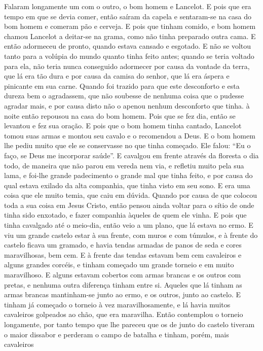 Falaram longamente um com o outro, o bom homem e Lancelot. E pois que era tempo
em que se devia comer, então saíram da capela e sentaram-se na casa do bom
homem e comeram pão e cerveja. E pois que tinham comido, e bom homem
chamou Lancelot a deitar-se na grama, como não tinha preparado outra cama. E
então adormeceu de pronto, quando estava cansado e esgotado. E não se voltou
tanto para a volúpia do mundo quanto tinha feito antes; quando se teria voltado
para ela, não teria nunca conseguido adormecer por causa da vontade da terra,
que lá era tão dura e por causa da camisa do senhor, que lá era áspera e
pinicante em sua carne. Quando foi trazido para que este desconforto e esta
dureza bem o agradassem, que não soubesse de nenhuma coisa que o pudesse
agradar mais, e por causa disto não o apenou nenhum desconforto que tinha. à
noite então repousou na casa do bom homem. Pois que se fez dia, então se
levantou e fez sua oração. E pois que o bom homem tinha cantado, Lancelot
tomou suas armas e montou seu cavalo e o recomendou a Deus. E o bom homem lhe
pediu muito que ele se conservasse no que tinha começado. Ele falou: “Eu o
faço, se Deus me incorporar saúde”. E cavalgou em frente através da floresta o
dia todo, de maneira que não parou em vereda nem via, e refletiu muito pela sua
lama, e foi-lhe grande padecimento o grande mal que tinha feito, e por causa do
qual estava exilado da alta companhia, que tinha visto em seu sono. E era uma
coisa que ele muito temia, que caiu em dúvida. Quando por causa de que colocou
toda a sua coisa em Jesus Cristo, então pensou ainda voltar para o sítio de
onde tinha sido enxotado, e fazer companhia àqueles de quem ele vinha. E pois
que tinha cavalgado até o meio-dia, então veio a um plano, que lá estava no
ermo. E viu um grande castelo estar à sua frente, com muros e com túmulos, e à
frente do castelo ficava um gramado, e havia tendas armadas de panos de seda e
cores maravilhosas, bem cem. E à frente das tendas estavam bem cem cavaleiros e
alguns grandes corcéis, e tinham começado um grande torneio e em muito
maravilhoso. E alguns estavam cobertos com armas brancas e os outros com
pretas, e nenhuma outra diferença tinham entre si. Aqueles que lá tinham as
armas brancas mantinham-se junto ao ermo, e os outros, junto ao castelo. E
tinham já começado o torneio à vez maravilhosamente, e lá havia muitos
cavaleiros golpeados ao chão, que era maravilha. Então contemplou o torneio
longamente, por tanto tempo que lhe pareceu que os de junto do castelo tiveram
o maior dissabor e perderam o campo de batalha e tinham, porém, mais cavaleiros
